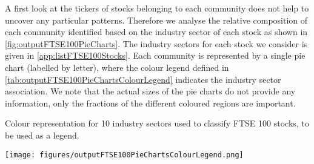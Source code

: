 A first look at the tickers of stocks belonging to each community does not help to uncover any particular patterns.
Therefore we analyse the relative composition of each community identified based on the industry sector of each stock as shown in \cref{fig:outputFTSE100PieCharts}.
The industry sectors for each stock we consider is given in \cref{app:listFTSE100Stocks}.
Each community is represented by a single pie chart (labelled by letter), where the colour legend defined in \cref{tab:outputFTSE100PieChartsColourLegend} indicates the industry sector association.
We note that the actual sizes of the pie charts do not provide any information, only the fractions of the different coloured regions are important.

\begin{table}
	\caption{Colour representation for 10 industry sectors used to classify FTSE 100 stocks, to be used as a legend.}
	\label{tab:outputFTSE100PieChartsColourLegend}
	\centering
	\texttt{[image: figures/outputFTSE100PieChartsColourLegend.png]}
\end{table}

